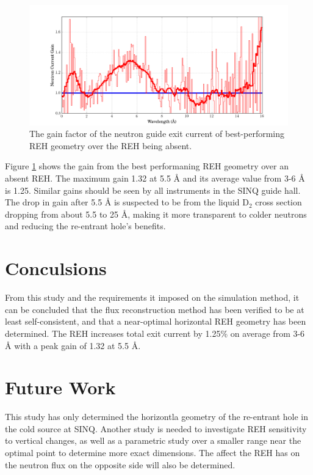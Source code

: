 \documentclass[a4paper]{jpconf}
\begin{document}
\begin{figure}
\begin{center}
\includegraphics[scale=0.38,trim={0cm 0cm 0cm 0cm},clip]{graphics/parametric_gain.pdf}
\end{center}
\caption{\label{parametric_gain}The gain factor of the neutron guide exit current of best-performing REH geometry over the REH being absent.}
\end{figure}


Figure \ref{parametric_gain} shows the gain from the best performaning REH geometry over an absent REH.  The maximum gain 1.32 at 5.5 \AA{} and its average value from 3-6 \AA{} is 1.25.  Similar gains should be seen by all instruments in the SINQ guide hall.  The drop in gain after 5.5 \AA{} is suspected to be from the liquid D$_2$ cross section dropping from about 5.5 to 25 \AA{}, making it more transparent to colder neutrons and reducing the re-entrant hole's benefits.


\section{Conculsions}

From this study and the requirements it imposed on the simulation method, it can be concluded that the flux reconstruction method has been verified to be at least self-consistent, and that a near-optimal horizontal REH geometry has been determined.  The REH increases total exit current by 1.25\% on average from 3-6 \AA{} with a peak gain of 1.32 at 5.5 \AA{}.

\section{Future Work}

This study has only determined the horizontla geometry of the re-entrant hole in the cold source at SINQ.  Another study is needed to investigate REH sensitivity to vertical changes, as well as a parametric study over a smaller range near the optimal point to determine more exact dimensions.  The affect the REH has on the neutron flux on the opposite side will also be determined.
\end{document}
